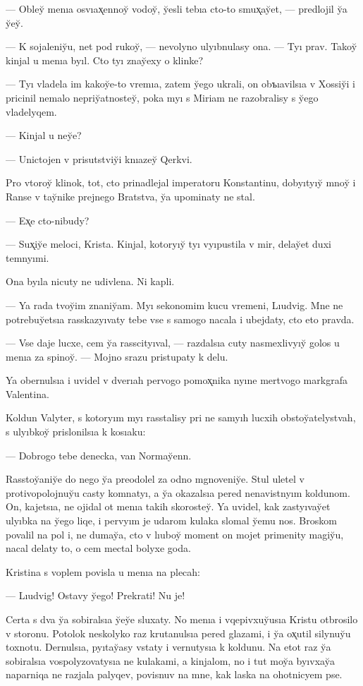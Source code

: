 \documentclass[10pt]{book}
\begin{document}
— Obley̆ menıa osvıax̨ennoy̆ vodoy̆, y̆esli tebıa cto-to smux̨ay̆et, — predlojil y̆a y̆ey̆.

— K sojaleniy̆u, net pod rukoy̆, — nevolyno ulyıbnulasy ona. — Tyı prav. Takoy̆ kinjal u menıa byıl. Cto tyı znay̆exy o klinke?

— Tyı vladela im kakoy̆e-to vremıa, zatem y̆ego ukrali, on obъıavilsıa v Xossiy̆i i pricinil nemalo nepriy̆atnostey̆, poka myı s Miriam ne razobralisy s y̆ego vladelyqem.

— Kinjal u ney̆e?

— Unictojen v prisutstviy̆i knıazey̆ Qerkvi.

Pro vtoroy̆ klinok, tot, cto prinadlejal imperatoru Konstantinu, dobyıtyıy̆ mnoy̆ i Ranse v tay̆nike prejnego Bratstva, y̆a upominaty ne stal.

— Ex̨e cto-nibudy?

— Sux̨iy̆e meloci, Krista. Kinjal, kotoryıy̆ tyı vyıpustila v mir, delay̆et duxi temnyımi.

Ona byıla nicuty ne udivlena. Ni kapli.

— Ya rada tvoy̆im znaniy̆am. Myı sekonomim kucu vremeni, Lıudvig. Mne ne potrebuy̆etsıa rasskazyıvaty tebe vse s samogo nacala i ubejdaty, cto eto pravda.

— Vse daje lucxe, cem y̆a rasscityıval, — razdalsıa cuty nasmexlivyıy̆ golos u menıa za spinoy̆. — Mojno srazu pristupaty k delu.

Ya obernulsıa i uvidel v dverıah pervogo pomox̨nika nyıne mertvogo markgrafa Valentina.

Koldun Valyter, s kotoryım myı rasstalisy pri ne samyıh lucxih obstoy̆atelystvah, s ulyıbkoy̆ prislonilsıa k kosıaku:

— Dobrogo tebe denecka, van Normay̆enn.

Rasstoy̆aniy̆e do nego y̆a preodolel za odno mgnoveniy̆e. Stul uletel v protivopolojnuy̆u casty komnatyı, a y̆a okazalsıa pered nenavistnyım koldunom. On, kajetsıa, ne ojidal ot menıa takih skorostey̆. Ya uvidel, kak zastyıvay̆et ulyıbka na y̆ego liqe, i pervyım je udarom kulaka slomal y̆emu nos. Broskom povalil na pol i, ne dumay̆a, cto v lıuboy̆ moment on mojet primenity magiy̆u, nacal delaty to, o cem mectal bolyxe goda.

Kristina s voplem povisla u menıa na plecah:

— Lıudvig! Ostavy y̆ego! Prekrati! Nu je!

Certa s dva y̆a sobiralsıa y̆ey̆e sluxaty. No menıa i vqepivxuy̆usıa Kristu otbrosilo v storonu. Potolok neskolyko raz krutanulsıa pered glazami, i y̆a ox̨util silynuy̆u toxnotu. Dernulsıa, pyıtay̆asy vstaty i vernutysıa k koldunu. Na etot raz y̆a sobiralsıa vospolyzovatysıa ne kulakami, a kinjalom, no i tut moy̆a byıvxay̆a naparniqa ne razjala palyqev, povisnuv na mne, kak laska na ohotnicyem pse.
\end{document}
